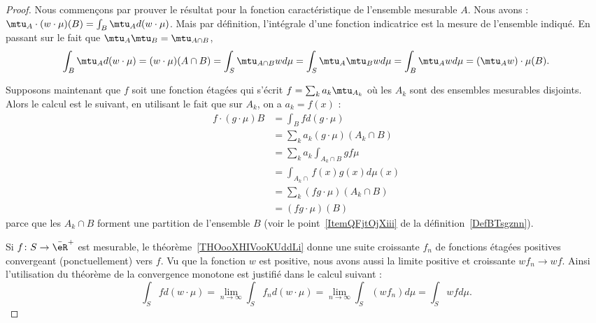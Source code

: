 \begin{proof}
    Nous commençons par prouver le résultat pour la fonction caractéristique de l'ensemble mesurable \( A\). Nous avons : $\mtu_A\cdot(w\cdot \mu)(B)=\int_B\mtu_Ad(w\cdot \mu)$. Mais par définition, l'intégrale d'une fonction indicatrice est la mesure de l'ensemble indiqué. En passant sur le fait que \( \mtu_A\mtu_B=\mtu_{A\cap B}\),
    \begin{equation}
        \int_B\mtu_Ad(w\cdot \mu)=   (w\cdot\mu)(A\cap B)=\int_S\mtu_{A\cap B}wd\mu=\int_S\mtu_A\mtu_Bwd\mu=\int_B\mtu_Awd\mu=(\mtu_Aw)\cdot\mu(B).
    \end{equation}

    Supposons maintenant que \( f\) soit une fonction étagées qui s'écrit \( f=\sum_ka_k\mtu_{A_k}\) où les \( A_k\) sont des ensembles mesurables disjoints. Alors le calcul est le suivant, en utilisant le fait que sur \( A_k\), on a \( a_k=f(x)\) :
    \begin{subequations}
        \begin{align}
            f\cdot(g\cdot \mu)B&=\int_Bfd(g\cdot \mu)\\
            &=\sum_ka_k(g\cdot\mu)(A_k\cap B)\\
            &=\sum_ka_k\int_{A_k\cap B}gf\mu\\
            &=\int_{A_k\cap}f(x)g(x)d\mu(x)\\
            &=\sum_k(fg\cdot\mu)(A_k\cap B)\\
            &=(fg\cdot\mu)(B)
        \end{align}
    \end{subequations}
    parce que les \( A_k\cap B\) forment une partition de l'ensemble \( B\) (voir le point~\ref{ItemQFjtOjXiii} de la définition~\ref{DefBTsgznn}).

    Si \( f\colon S\to \bar\eR^+\) est mesurable, le théorème~\ref{THOooXHIVooKUddLi} donne une suite croissante \( f_n\) de fonctions étagées positives convergeant (ponctuellement) vers \( f\). Vu que la fonction \( w\) est positive, nous avons aussi la limite positive et croissante \( wf_n\to wf\). Ainsi l'utilisation du théorème de la convergence monotone est justifié dans le calcul suivant :
    \begin{equation}
        \int_Sfd(w\cdot \mu)=\lim_{n\to \infty} \int_Sf_nd(w\cdot\mu)=\lim_{n\to \infty} \int_S(wf_n)d\mu=\int_Swfd\mu.
    \end{equation}


\end{proof}
